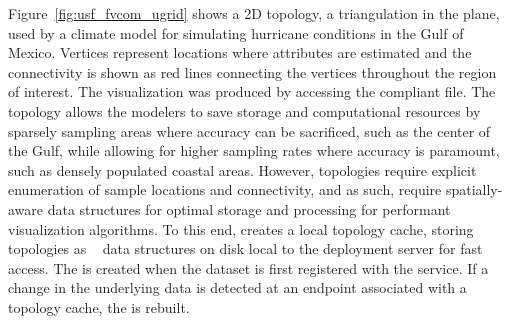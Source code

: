 Figure~\ref{fig:usf_fvcom_ugrid} shows a \ugrid{} 2D topology, a
triangulation in the plane, used by a climate model for simulating
hurricane conditions in the Gulf of Mexico. Vertices represent
locations where attributes are estimated and the connectivity is shown
as red lines connecting the vertices throughout the region of
interest. The visualization was produced by accessing the \cfugrid{}
compliant \ncml{} file. The \ugrid{} topology allows the modelers to
save storage and computational resources by sparsely sampling areas
where accuracy can be sacrificed, such as the center of the Gulf,
while allowing for higher sampling rates where accuracy is paramount,
such as densely populated coastal areas. However, \ugrid{} topologies
require explicit enumeration of sample locations and connectivity, and
as such, require spatially-aware data structures for optimal storage
and processing for performant visualization algorithms. To this end,
\sciwms{} creates a local topology cache, storing \ugrid{} topologies
as \rtree{}~\cite{Guttman84} data structures on disk local to the
deployment server for fast access. The \rtree{} is created when the
dataset is first registered with the \sciwms{} service. If a change in
the underlying data is detected at an endpoint associated with a
topology cache, the \rtree{} is rebuilt.
